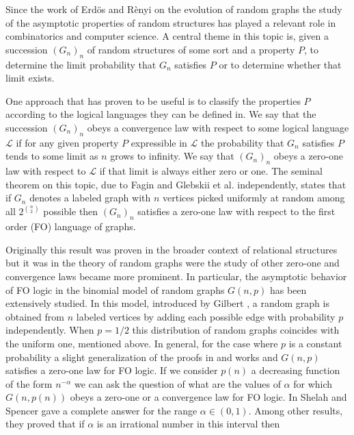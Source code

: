 \documentclass[12pt,notitlepage,a4paper]{article}
\theoremstyle{definition}
\begin{document}
Since the work of Erd\"os and R\`enyi on the evolution of random graphs
\cite{erdHos1960evolution} the study of the asymptotic properties of random
structures has played a relevant role in combinatorics and computer science.
A central theme in this topic is, given a succession $(G_n)_n$ of random
structures of some sort and a property $P$, to determine the limit probability
that $G_n$ satisfies $P$ or to determine whether that limit exists. \par
One approach that has proven to be useful is to classify the properties $P$
according to the logical languages they can be defined in. We say that the 
succession $(G_n)_n$ obeys a convergence law with respect to some logical language
$\mathcal{L}$ if for any given property $P$ expressible in $\mathcal{L}$ the 
probability that $G_n$ satisfies $P$ tends to some limit as $n$ grows to infinity.
We say that $(G_n)_n$ obeys a zero-one law with respect to $\mathcal{L}$ if
that limit is always either zero or one. 
The seminal theorem on this topic, due to Fagin \cite{fagin1976probabilities}
and Glebskii et al. 
\cite{glebskii1969range} independently, states that if $G_n$ denotes a labeled
graph with $n$ vertices picked uniformly at random among all $2^{\binom{n}{2}}$ 
possible then $(G_n)_n$ satisfies a zero-one law with respect to the first order
(FO) language of graphs. \par
Originally this result was proven in the broader context of relational
structures but it was in the theory of random graphs were the study of 
other zero-one and convergence laws became more prominent. In particular,
the asymptotic behavior of FO logic in the binomial model of random graphs 
$G(n,p)$ has been extensively studied. In this model, introduced by Gilbert 
\cite{gilbert1959random}, a random graph is obtained from $n$ labeled vertices
by adding each possible edge with probability $p$ independently. When $p=1/2$
this distribution of random graphs coincides with the uniform one, mentioned 
above. In general, for the case where $p$ is a constant probability a slight 
generalization of the proofs in \cite{fagin1976probabilities} and 
\cite{glebskii1969range} works and $G(n,p)$ satisfies a zero-one law 
for FO logic. If we consider $p(n)$ a decreasing function of the form
$n^{-\alpha}$ we can ask the question of what are the values of $\alpha$
for which $G(n,p(n))$ obeys a zero-one or a convergence law for FO logic. 
In \cite{shelah1988zero} Shelah and Spencer gave a complete answer 
for the range $\alpha\in (0,1)$. Among other results, they proved that
if $\alpha$ is an irrational number in this interval then
\end{document}
